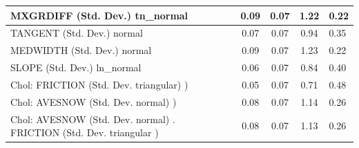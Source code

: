 \begin{table}
\begin{center}
\begin{tabular}{|l|l|c|c|c|l|}
			\hline
			MXGRDIFF (Std. Dev.) tn_normal &  & 0.09 & 0.07 & 1.22 & 0.22 \\
			\hline
			TANGENT (Std. Dev.) normal &  & 0.07 & 0.07 & 0.94 & 0.35 \\
			\hline
			MEDWIDTH (Std. Dev.) normal &  & 0.09 & 0.07 & 1.23 & 0.22 \\
			\hline
			SLOPE (Std. Dev.) ln_normal &  & 0.06 & 0.07 & 0.84 & 0.40 \\
			\hline
			 Chol: FRICTION (Std. Dev. triangular) ) &  & 0.05 & 0.07 & 0.71 & 0.48 \\
			\hline
			 Chol: AVESNOW (Std. Dev. normal) ) &  & 0.08 & 0.07 & 1.14 & 0.26 \\
			\hline
			 Chol: AVESNOW (Std. Dev. normal) . FRICTION (Std. Dev.   triangular ) &  & 0.08 & 0.07 & 1.13 & 0.26 \\
			\hline
		\end{tabular}
	\end{center}
\end{table}